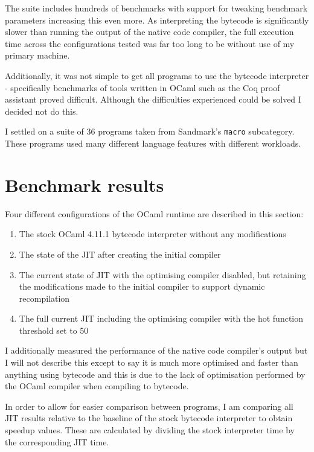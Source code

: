 The suite includes hundreds of benchmarks with support for tweaking benchmark parameters increasing
this even more. As interpreting the bytecode is significantly slower than running the output of the
native code compiler, the full execution time across the configurations tested was far too long to
be without use of my primary machine.

Additionally, it was not simple to get all programs to use the bytecode interpreter - specifically
benchmarks of tools written in OCaml such as the Coq proof assistant proved difficult. Although the
difficulties experienced could be solved I decided not do this.

I settled on a suite of 36 programs taken from Sandmark's \texttt{macro} subcategory. These
programs
used many different language features with different workloads.

\section{Benchmark results}

Four different configurations of the OCaml runtime are described in this section:

\begin{enumerate}
    \item The stock OCaml 4.11.1 bytecode interpreter without any modifications
    \item The state of the JIT after creating the initial compiler
    \item The current state of JIT with the optimising compiler disabled, but retaining
          the modifications made to the initial compiler to support dynamic recompilation
    \item The full current JIT including the optimising compiler with the hot function threshold
          set to 50
\end{enumerate}

I additionally measured the performance of the native code compiler's output but I will not
describe
this except to say it is much more optimised and faster than anything using bytecode and this is
due
to the lack of optimisation performed by the OCaml compiler when compiling to bytecode.

In order to allow for easier comparison between programs, I am comparing all JIT results relative
to
the baseline of the stock bytecode interpreter to obtain speedup values. These are calculated by
dividing the stock interpreter time by the corresponding JIT time.


